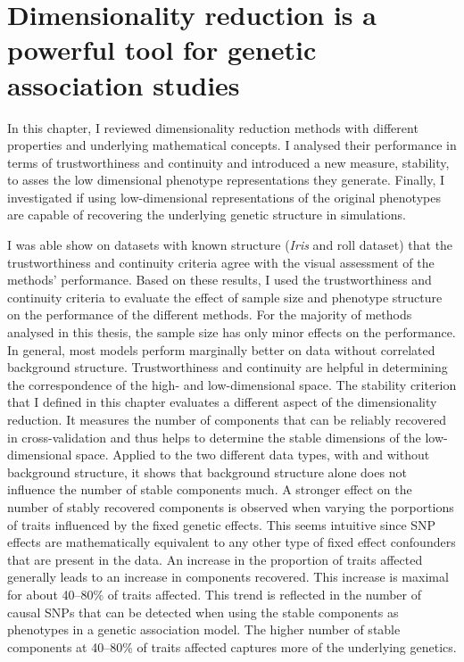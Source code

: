 \section{Dimensionality reduction is a powerful tool for genetic association studies}
In this chapter, I reviewed dimensionality reduction methods with different properties and underlying mathematical concepts. I analysed their performance in terms of trustworthiness and continuity and introduced a new measure, stability, to asses the low dimensional phenotype representations they generate. Finally, I investigated if using low-dimensional representations of the original phenotypes are capable of recovering the underlying genetic structure in simulations.

I was able show on datasets with known structure (\textit{Iris} and roll dataset) that the trustworthiness and continuity criteria agree with the visual assessment of the methods' performance. Based on these results, I used the trustworthiness and continuity criteria to evaluate the effect of sample size and phenotype structure on the performance of the different methods. For the majority of methods analysed in this thesis, the sample size has only minor effects on the performance. In general, most models perform marginally better on data without correlated background structure. Trustworthiness and continuity are helpful in determining the correspondence of the high- and low-dimensional space. The stability criterion that I defined in this chapter evaluates a different aspect of the dimensionality reduction. It measures the number of components that can be reliably recovered in cross-validation and thus helps to determine the stable dimensions of the low-dimensional space. Applied to the two different data types, with and without background structure, it shows that background structure alone does not influence the number of stable components much. A stronger effect on the number of stably recovered components is observed when varying the porportions of traits influenced by the fixed genetic effects. This seems intuitive since SNP effects are mathematically equivalent to any other type of fixed effect confounders that are present in the data. An increase in the proportion of traits affected generally leads to an increase in components recovered. This increase is maximal for about \numrange{40}{80}\% of traits affected. This trend is reflected in the number of causal SNPs that can be detected when using the stable components as phenotypes in a genetic association model. The higher number of stable components at \numrange{40}{80}\% of traits affected captures more of the underlying genetics. 

